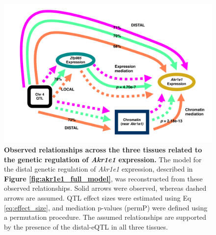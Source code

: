 \documentclass[9pt,twocolumn,twoside]{gsajnl}
\begin{document}
\begin{figure}[hp]
\renewcommand{\familydefault}{\sfdefault}\normalfont
\centering
\includegraphics[width=\textwidth, trim={0in 0in 0in 0in}, clip]{figs/akr1e1_observed_relationships.pdf}
\caption{\textbf{Observed relationships across the three tissues related to the genetic regulation of \textit{Akr1e1} expression.} The model for the distal genetic regulation of \textit{Akr1e1} expression, described in \textbf{Figure \ref{fig:akr1e1_full_model}}, was reconstructed from these observed relationships. Solid arrows were observed, whereas dashed arrows are assumed. QTL effect sizes were estimated using Eq \ref{eq:effect_size}, and mediation p-values (permP) were defined using a permutation procedure. The assumed relationships are supported by the presence of the distal-eQTL in all three tissues.
\label{fig:akr1e1_relationships}}
\end{figure}
\end{document}
